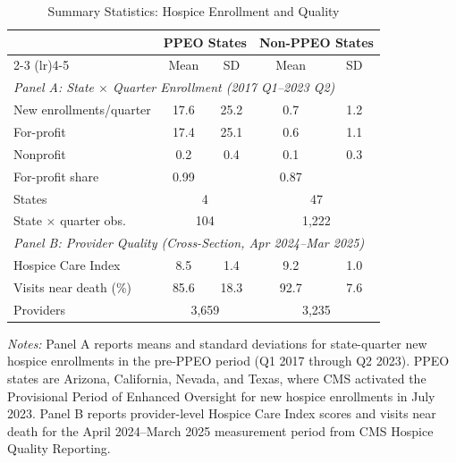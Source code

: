 \begin{table}[htbp]
\centering
\caption{Summary Statistics: Hospice Enrollment and Quality}
\label{tab:sumstats}
\small
\begin{tabular}{lcccc}
\toprule
 & \multicolumn{2}{c}{PPEO States} & \multicolumn{2}{c}{Non-PPEO States} \\
\cmidrule(lr){2-3} \cmidrule(lr){4-5}
 & Mean & SD & Mean & SD \\
\midrule
\multicolumn{5}{l}{\textit{Panel A: State $\times$ Quarter Enrollment (2017 Q1--2023 Q2)}} \\[3pt]
New enrollments/quarter & 17.6 & 25.2 & 0.7 & 1.2 \\
\quad For-profit & 17.4 & 25.1 & 0.6 & 1.1 \\
\quad Nonprofit & 0.2 & 0.4 & 0.1 & 0.3 \\
For-profit share & 0.99 & & 0.87 & \\
States & \multicolumn{2}{c}{4} & \multicolumn{2}{c}{47} \\
State $\times$ quarter obs. & \multicolumn{2}{c}{104} & \multicolumn{2}{c}{1,222} \\[6pt]
\multicolumn{5}{l}{\textit{Panel B: Provider Quality (Cross-Section, Apr 2024--Mar 2025)}} \\[3pt]
Hospice Care Index & 8.5 & 1.4 & 9.2 & 1.0 \\
Visits near death (\%) & 85.6 & 18.3 & 92.7 & 7.6 \\
Providers & \multicolumn{2}{c}{3,659} & \multicolumn{2}{c}{3,235} \\
\bottomrule
\end{tabular}
\vspace{0.5em}
\begin{minipage}{\textwidth}
\small \textit{Notes:} Panel A reports means and standard deviations for state-quarter new hospice enrollments in the pre-PPEO period (Q1 2017 through Q2 2023). PPEO states are Arizona, California, Nevada, and Texas, where CMS activated the Provisional Period of Enhanced Oversight for new hospice enrollments in July 2023. Panel B reports provider-level Hospice Care Index scores and visits near death for the April 2024--March 2025 measurement period from CMS Hospice Quality Reporting.
\end{minipage}
\end{table}

